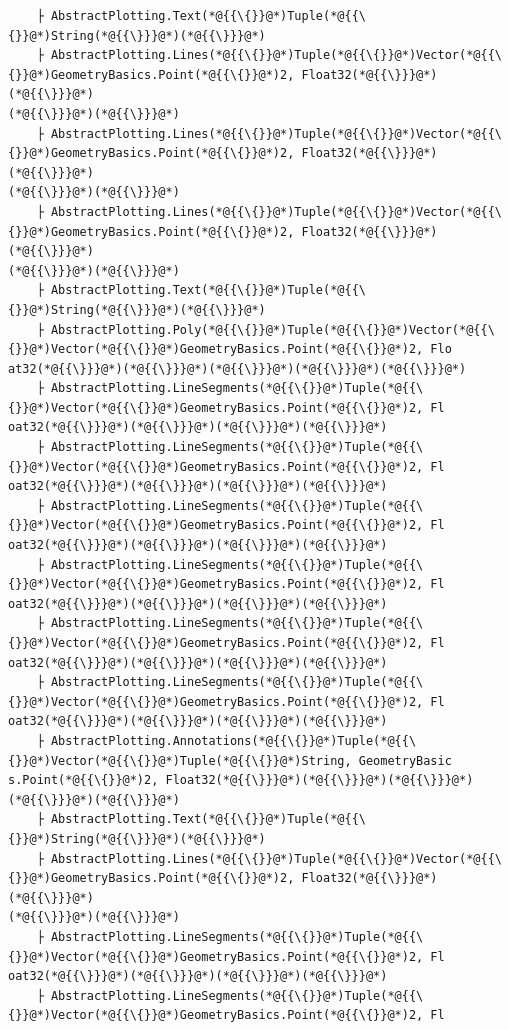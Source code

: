\documentclass[12pt,a4paper]{article}
\begin{document}
\begin{lstlisting}
    ├ AbstractPlotting.Text(*@{{\{}}@*)Tuple(*@{{\{}}@*)String(*@{{\}}}@*)(*@{{\}}}@*)
    ├ AbstractPlotting.Lines(*@{{\{}}@*)Tuple(*@{{\{}}@*)Vector(*@{{\{}}@*)GeometryBasics.Point(*@{{\{}}@*)2, Float32(*@{{\}}}@*)(*@{{\}}}@*)
(*@{{\}}}@*)(*@{{\}}}@*)
    ├ AbstractPlotting.Lines(*@{{\{}}@*)Tuple(*@{{\{}}@*)Vector(*@{{\{}}@*)GeometryBasics.Point(*@{{\{}}@*)2, Float32(*@{{\}}}@*)(*@{{\}}}@*)
(*@{{\}}}@*)(*@{{\}}}@*)
    ├ AbstractPlotting.Lines(*@{{\{}}@*)Tuple(*@{{\{}}@*)Vector(*@{{\{}}@*)GeometryBasics.Point(*@{{\{}}@*)2, Float32(*@{{\}}}@*)(*@{{\}}}@*)
(*@{{\}}}@*)(*@{{\}}}@*)
    ├ AbstractPlotting.Text(*@{{\{}}@*)Tuple(*@{{\{}}@*)String(*@{{\}}}@*)(*@{{\}}}@*)
    ├ AbstractPlotting.Poly(*@{{\{}}@*)Tuple(*@{{\{}}@*)Vector(*@{{\{}}@*)Vector(*@{{\{}}@*)GeometryBasics.Point(*@{{\{}}@*)2, Flo
at32(*@{{\}}}@*)(*@{{\}}}@*)(*@{{\}}}@*)(*@{{\}}}@*)(*@{{\}}}@*)
    ├ AbstractPlotting.LineSegments(*@{{\{}}@*)Tuple(*@{{\{}}@*)Vector(*@{{\{}}@*)GeometryBasics.Point(*@{{\{}}@*)2, Fl
oat32(*@{{\}}}@*)(*@{{\}}}@*)(*@{{\}}}@*)(*@{{\}}}@*)
    ├ AbstractPlotting.LineSegments(*@{{\{}}@*)Tuple(*@{{\{}}@*)Vector(*@{{\{}}@*)GeometryBasics.Point(*@{{\{}}@*)2, Fl
oat32(*@{{\}}}@*)(*@{{\}}}@*)(*@{{\}}}@*)(*@{{\}}}@*)
    ├ AbstractPlotting.LineSegments(*@{{\{}}@*)Tuple(*@{{\{}}@*)Vector(*@{{\{}}@*)GeometryBasics.Point(*@{{\{}}@*)2, Fl
oat32(*@{{\}}}@*)(*@{{\}}}@*)(*@{{\}}}@*)(*@{{\}}}@*)
    ├ AbstractPlotting.LineSegments(*@{{\{}}@*)Tuple(*@{{\{}}@*)Vector(*@{{\{}}@*)GeometryBasics.Point(*@{{\{}}@*)2, Fl
oat32(*@{{\}}}@*)(*@{{\}}}@*)(*@{{\}}}@*)(*@{{\}}}@*)
    ├ AbstractPlotting.LineSegments(*@{{\{}}@*)Tuple(*@{{\{}}@*)Vector(*@{{\{}}@*)GeometryBasics.Point(*@{{\{}}@*)2, Fl
oat32(*@{{\}}}@*)(*@{{\}}}@*)(*@{{\}}}@*)(*@{{\}}}@*)
    ├ AbstractPlotting.LineSegments(*@{{\{}}@*)Tuple(*@{{\{}}@*)Vector(*@{{\{}}@*)GeometryBasics.Point(*@{{\{}}@*)2, Fl
oat32(*@{{\}}}@*)(*@{{\}}}@*)(*@{{\}}}@*)(*@{{\}}}@*)
    ├ AbstractPlotting.Annotations(*@{{\{}}@*)Tuple(*@{{\{}}@*)Vector(*@{{\{}}@*)Tuple(*@{{\{}}@*)String, GeometryBasic
s.Point(*@{{\{}}@*)2, Float32(*@{{\}}}@*)(*@{{\}}}@*)(*@{{\}}}@*)(*@{{\}}}@*)(*@{{\}}}@*)
    ├ AbstractPlotting.Text(*@{{\{}}@*)Tuple(*@{{\{}}@*)String(*@{{\}}}@*)(*@{{\}}}@*)
    ├ AbstractPlotting.Lines(*@{{\{}}@*)Tuple(*@{{\{}}@*)Vector(*@{{\{}}@*)GeometryBasics.Point(*@{{\{}}@*)2, Float32(*@{{\}}}@*)(*@{{\}}}@*)
(*@{{\}}}@*)(*@{{\}}}@*)
    ├ AbstractPlotting.LineSegments(*@{{\{}}@*)Tuple(*@{{\{}}@*)Vector(*@{{\{}}@*)GeometryBasics.Point(*@{{\{}}@*)2, Fl
oat32(*@{{\}}}@*)(*@{{\}}}@*)(*@{{\}}}@*)(*@{{\}}}@*)
    ├ AbstractPlotting.LineSegments(*@{{\{}}@*)Tuple(*@{{\{}}@*)Vector(*@{{\{}}@*)GeometryBasics.Point(*@{{\{}}@*)2, Fl

\end{lstlisting}
\end{document}
